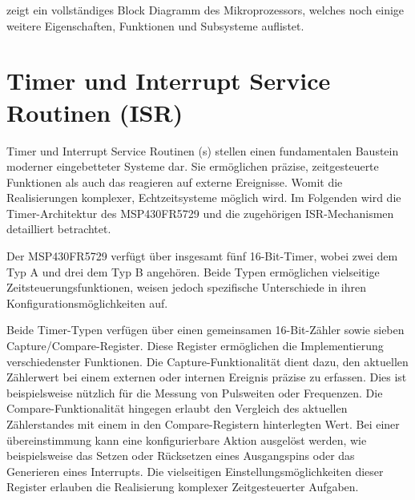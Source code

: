 \newpage
{} zeigt ein vollst\"andiges Block Diagramm des Mikroprozessors, welches noch einige weitere Eigenschaften, Funktionen und Subsysteme auflistet. \AI


\section{Timer und Interrupt Service Routinen (ISR)}
\label{sec:TIMER&ISR}

Timer und Interrupt Service Routinen (s) stellen einen fundamentalen Baustein moderner eingebetteter Systeme dar. Sie erm\"oglichen pr\"azise, zeitgesteuerte Funktionen als auch das reagieren auf externe Ereignisse. Womit die Realisierungen komplexer, Echtzeitsysteme m\"oglich wird. Im Folgenden wird die Timer-Architektur des MSP430FR5729 und die zugeh\"origen ISR-Mechanismen detailliert betrachtet.

Der MSP430FR5729 verf\"ugt \"uber insgesamt f\"unf 16-Bit-Timer, wobei zwei dem Typ A und drei dem Typ B angeh\"oren. Beide Typen erm\"oglichen vielseitige Zeitsteuerungsfunktionen, weisen jedoch spezifische Unterschiede in ihren Konfigurationsm\"oglichkeiten auf.

Beide Timer-Typen verf\"ugen \"uber einen gemeinsamen 16-Bit-Z\"ahler sowie sieben Capture/Compare-Register. Diese Register erm\"oglichen die Implementierung verschiedenster Funktionen. Die Capture-Funktionalit\"at dient dazu, den aktuellen Z\"ahlerwert bei einem externen oder internen Ereignis pr\"azise zu erfassen. Dies ist beispielsweise n\"utzlich f\"ur die Messung von Pulsweiten oder Frequenzen. Die Compare-Funktionalit\"at hingegen erlaubt den Vergleich des aktuellen Z\"ahlerstandes mit einem in den Compare-Registern hinterlegten Wert. Bei einer \"ubereinstimmung kann eine konfigurierbare Aktion ausgel\"ost werden, wie beispielsweise das Setzen oder R\"ucksetzen eines Ausgangspins oder das Generieren eines Interrupts. Die vielseitigen Einstellungsm\"oglichkeiten dieser Register erlauben die Realisierung komplexer Zeitgesteuerter Aufgaben. 

